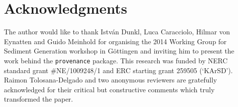 \documentclass{article}
\begin{document}
\section*{Acknowledgments}

The author would like to thank Istv\'{a}n Dunkl, Luca Caracciolo,
Hilmar von Eynatten and Guido Meinhold for organising the 2014 Working
Group for Sediment Generation workshop in G\"{o}ttingen and inviting
him to present the work behind the {\tt provenance} package.  This
research was funded by NERC standard grant \#NE/1009248/1 and ERC
starting grant 259505 (`KArSD'). Raimon Tolosana-Delgado and two
anonymous reviewers are gratefully acknowledged for their critical but
constructive comments which truly transformed the paper.

%
%
\end{document}
